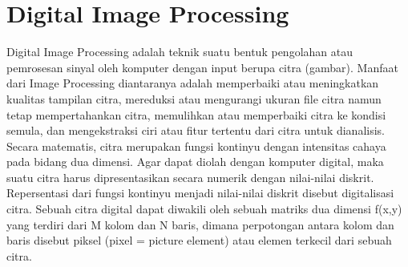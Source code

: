 
\section{Digital Image Processing}
Digital Image Processing adalah teknik suatu bentuk pengolahan atau pemrosesan sinyal oleh komputer dengan input berupa citra (gambar). Manfaat dari Image Processing diantaranya adalah memperbaiki atau meningkatkan kualitas tampilan citra, mereduksi atau mengurangi ukuran file citra namun tetap mempertahankan citra, memulihkan atau memperbaiki citra ke kondisi semula, dan mengekstraksi ciri atau fitur tertentu dari citra untuk dianalisis.
Secara matematis, citra merupakan fungsi kontinyu dengan intensitas cahaya pada bidang dua dimensi. Agar dapat diolah dengan komputer digital, maka suatu citra harus dipresentasikan secara numerik dengan nilai-nilai diskrit.
Repersentasi dari fungsi kontinyu menjadi nilai-nilai diskrit disebut digitalisasi citra. Sebuah citra digital dapat diwakili oleh sebuah matriks dua dimensi f(x,y) yang terdiri dari M kolom dan N baris, dimana perpotongan antara kolom dan baris disebut piksel (pixel = picture element) atau elemen terkecil dari sebuah citra.




